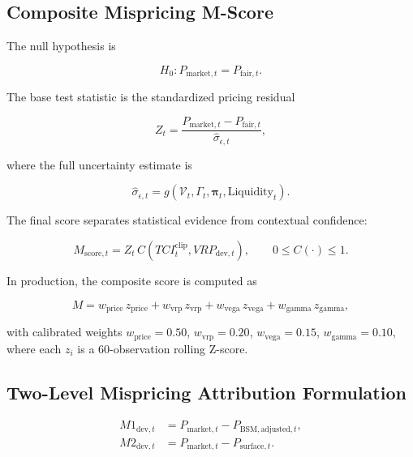 \documentclass[journal]{IEEEtran}
\begin{document}
\subsection{Composite Mispricing M-Score}

The null hypothesis is

\begin{equation}
\label{eq:mscore_null}
H_0: P_{\mathrm{market},t} = P_{\mathrm{fair},t}.
\end{equation}

The base test statistic is the standardized pricing residual

\begin{equation}
\label{eq:mscore_residual}
Z_t = \frac{P_{\mathrm{market},t} - P_{\mathrm{fair},t}}
{\widehat{\sigma}_{\epsilon,t}},
\end{equation}

where the full uncertainty estimate is

\begin{equation}
\label{eq:mscore_uncertainty}
\widehat{\sigma}_{\epsilon,t}
= g\!\left(\mathcal{V}_t,\Gamma_t,\boldsymbol{\pi}_t,
\mathrm{Liquidity}_t\right).
\end{equation}

The final score separates statistical evidence from contextual
confidence:

\begin{equation}
\label{eq:mscore}
M_{\mathrm{score},t} = Z_t\,C\!\left(TCI^{\mathrm{clip}}_t,
VRP_{\mathrm{dev},t}\right), \qquad 0\leq C(\cdot)\leq1.
\end{equation}

In production, the composite score is computed as

\begin{equation}
M = w_{\text{price}}\,z_{\text{price}}
  + w_{\text{vrp}}\,z_{\text{vrp}}
  + w_{\text{vega}}\,z_{\text{vega}}
  + w_{\text{gamma}}\,z_{\text{gamma}},
\label{eq:mscore_production}
\end{equation}

with calibrated weights $w_{\text{price}}=0.50$, $w_{\text{vrp}}=0.20$,
$w_{\text{vega}}=0.15$, $w_{\text{gamma}}=0.10$, where each $z_i$ is
a 60-observation rolling Z-score.

\subsection{Two-Level Mispricing Attribution Formulation}

\begin{equation}
\label{eq:two_level_deviations}
\begin{aligned}
M1_{\mathrm{dev},t} &= P_{\mathrm{market},t}-P_{\mathrm{BSM,adjusted},t},\\
M2_{\mathrm{dev},t} &= P_{\mathrm{market},t}-P_{\mathrm{surface},t}.
\end{aligned}
\end{equation}
\end{document}
